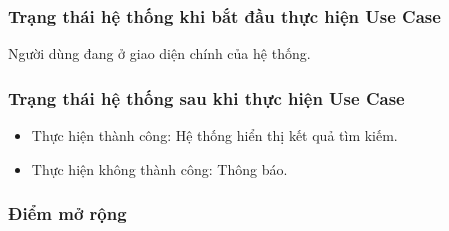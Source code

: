 \subsubsection{Trạng thái hệ thống khi bắt đầu thực hiện Use Case}
Người dùng đang ở giao diện chính của hệ thống.

\subsubsection{Trạng thái hệ thống sau khi thực hiện Use Case}
\begin{itemize}
  \item Thực hiện thành công: Hệ thống hiển thị kết quả tìm kiếm.
  \item Thực hiện không thành công: Thông báo.
\end{itemize}

\subsubsection{Điểm mở rộng}